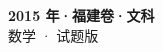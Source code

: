 \documentclass[zihao=-4, a4paper]{ctexart}
\begin{document}
\begin{center}
  {\Large\bfseries 2015 年·福建卷·文科}\\[4pt]
  {\large 数学 · 试题版}
\end{center}
\medskip
{}

\end{document}

